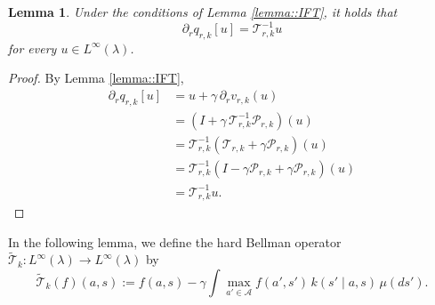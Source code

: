 \documentclass[11pt]{article}
\theoremstyle{plain}
\newtheorem{lemma}[theorem]{Lemma}
\begin{document}
\begin{lemma}
\label{lemma::qderiv}
Under the conditions of Lemma \ref{lemma::IFT}, it holds that
\[
\partial_r q_{r,k}[u] = \mathcal{T}_{r,k}^{-1}u
\]
for every $u \in L^\infty(\lambda)$.
\end{lemma}




\begin{proof}
By Lemma \ref{lemma::IFT},
\begin{align*}
    \partial_r q_{r,k}[u] 
    &= u + \gamma \,\partial_r v_{r,k}(u) \\
    &= \left(I + \gamma \,\mathcal{T}_{r,k}^{-1}\mathcal{P}_{r,k}\right)(u) \\
    &= \mathcal{T}_{r,k}^{-1}\left(\mathcal{T}_{r,k} + \gamma \mathcal{P}_{r,k}\right)(u) \\
    &= \mathcal{T}_{r,k}^{-1}\left(I - \gamma \mathcal{P}_{r,k} + \gamma \mathcal{P}_{r,k}\right)(u) \\
    &= \mathcal{T}_{r,k}^{-1} u.
\end{align*}
\end{proof}


In the following lemma, we define the hard Bellman operator $\widetilde{\mathcal{T}}_k: L^\infty(\lambda) \to L^\infty(\lambda)$ by
\[
\widetilde{\mathcal{T}}_k(f)(a,s) 
:= f(a,s) - \gamma \int \max_{a' \in \mathcal{A}} f(a',s')\,k(s'\mid a,s)\,\mu(ds').
\] 


 

 
 
\end{document}
